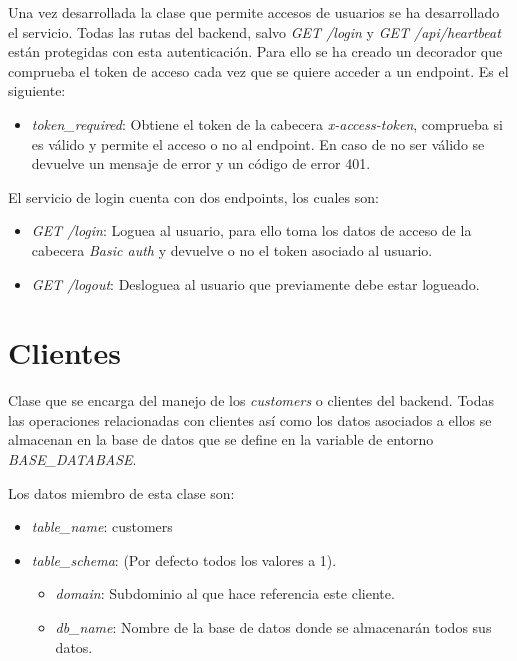 \bigskip
Una vez desarrollada la clase que permite accesos de usuarios se ha desarrollado el servicio. Todas las rutas del backend, salvo \textit{GET /login} y \textit{GET /api/heartbeat} están protegidas con esta autenticación. Para ello se ha creado un decorador que comprueba el token de acceso cada vez que se quiere acceder a un endpoint. Es el siguiente:
\begin{itemize}
	\item \textit{token\_required}: Obtiene el token de la cabecera \textit{x-access-token}, comprueba si es válido y permite el acceso o no al endpoint. En caso de no ser válido se devuelve un mensaje de error y un código de error 401.
\end{itemize}


\bigskip
El servicio de login cuenta con dos endpoints, los cuales son:
\begin{itemize}
	\item \textit{GET /login}: Loguea al usuario, para ello toma los datos de acceso de la cabecera \textit{Basic auth} y devuelve o no el token asociado al usuario.
	\item \textit{GET /logout}: Desloguea al usuario que previamente debe estar logueado.
\end{itemize}




\section{Clientes}

Clase que se encarga del manejo de los \textit{customers} o clientes del backend. Todas las operaciones relacionadas con clientes así como los datos asociados a ellos se almacenan en la base de datos que se define en la variable de entorno \textit{BASE\_DATABASE}.

\bigskip
Los datos miembro de esta clase son:
\begin{itemize}
	\item \textit{table\_name}: customers
	\item \textit{table\_schema}: (Por defecto todos los valores a 1).
	\begin{itemize}
		\item \textit{domain}: Subdominio al que hace referencia este cliente.
		\item \textit{db\_name}: Nombre de la base de datos donde se almacenarán todos sus datos.
	\end{itemize}
\end{itemize}


